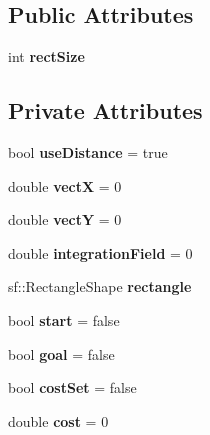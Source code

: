 \subsection*{Public Attributes}
\begin{DoxyCompactItemize}
\item 
\mbox{\label{class_node_a2e322c34152537dd2bec43ad60e1be0b}} 
int {\bfseries rect\+Size}
\end{DoxyCompactItemize}
\subsection*{Private Attributes}
\begin{DoxyCompactItemize}
\item 
\mbox{\label{class_node_ad2af1003bff44ae41540d812e7d6a43f}} 
bool {\bfseries use\+Distance} = true
\item 
\mbox{\label{class_node_aad84ff62bb1ee73058dea68759b92b33}} 
double {\bfseries vectX} = 0
\item 
\mbox{\label{class_node_a07546c605cfcb7bd8819c5dbfeb67a39}} 
double {\bfseries vectY} = 0
\item 
\mbox{\label{class_node_aed83b557f50b4891d285aa1c0fbff485}} 
double {\bfseries integration\+Field} = 0
\item 
\mbox{\label{class_node_a83fb85bdafcc4a764b6b6b8c31b63b4c}} 
sf\+::\+Rectangle\+Shape {\bfseries rectangle}
\item 
\mbox{\label{class_node_a1d5854f89d8291b5790f6c428ee293ff}} 
bool {\bfseries start} = false
\item 
\mbox{\label{class_node_a8452fe942107b0ca329892da2dbbbfbc}} 
bool {\bfseries goal} = false
\item 
\mbox{\label{class_node_a054e3940b7350c170fe70a367e6e9746}} 
bool {\bfseries cost\+Set} = false
\item 
\mbox{\label{class_node_a6e7b74adca863064ca0d1684873f33e0}} 
double {\bfseries cost} = 0
\end{DoxyCompactItemize}


